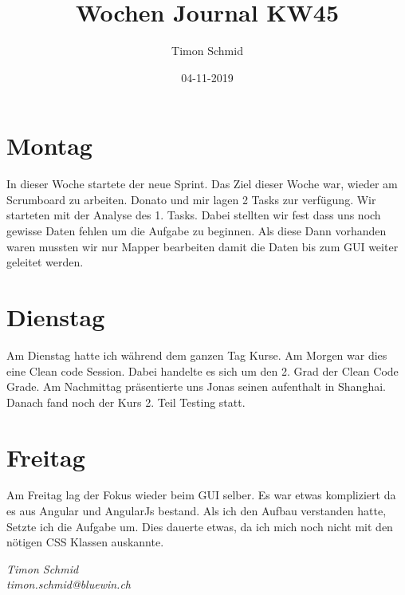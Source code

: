 \documentclass[12pt, titlepage]{article}
\title{Wochen Journal KW45}
\date{04-11-2019}
\author{Timon Schmid}
\begin{document}
  \maketitle

  \newpage


  \section{Montag}
  In dieser Woche startete der neue Sprint. Das Ziel dieser Woche war, wieder am
  Scrumboard zu arbeiten. Donato und mir lagen 2 Tasks zur verfügung. Wir starteten
  mit der Analyse des 1. Tasks. Dabei stellten wir fest dass uns noch gewisse Daten
  fehlen um die Aufgabe zu beginnen. Als diese Dann vorhanden waren mussten wir nur
  Mapper bearbeiten damit die Daten bis zum GUI weiter geleitet werden.

  \section{Dienstag}
  Am Dienstag hatte ich während dem ganzen Tag Kurse. Am Morgen war dies eine Clean
  code Session. Dabei handelte es sich um den 2. Grad der Clean Code Grade. Am
  Nachmittag präsentierte uns Jonas seinen aufenthalt in Shanghai. Danach fand
  noch der Kurs 2. Teil Testing statt.

  \section{Freitag}
  Am Freitag lag der Fokus wieder beim GUI selber. Es war etwas kompliziert da es
  aus Angular und AngularJs bestand. Als ich den Aufbau verstanden hatte, Setzte
  ich die Aufgabe um. Dies dauerte etwas, da ich mich noch nicht mit den nötigen
  CSS Klassen auskannte.

  \textit{Timon Schmid \\ timon.schmid@bluewin.ch}
\end{document}
